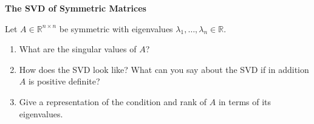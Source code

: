 \textbf{\normalsize The SVD of Symmetric Matrices}

Let $A\in \mathbb{R}^{n\times n}$ be symmetric with eigenvalues $\lambda_1, \ldots, \lambda_n \in \mathbb{R}$.
\begin{enumerate}
	\item What are the singular values of $A$?
	\item How does the SVD look like? What can you say about the SVD if in addition $A$ is positive definite?
	\item Give a representation of the condition and rank of $A$ in terms of its eigenvalues.
\end{enumerate} 